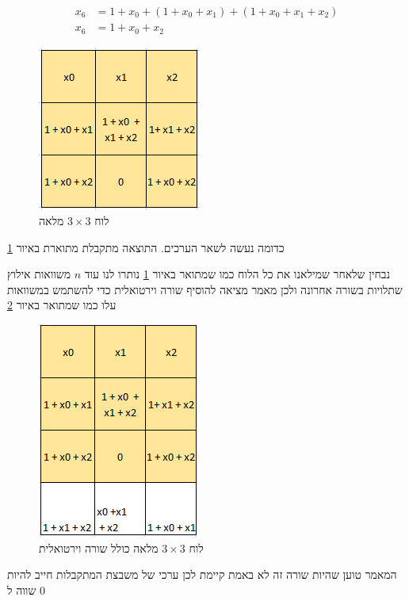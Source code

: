 \documentclass[12pt,twoside]{article}
\begin{document}
\begin{align*}
    x_6 &= 1 + x_0 + (1 + x_0 + x_1) + (1 + x_0 + x_1 + x_2) \\
    x_6 &= 1 + x_0 + x_2
\end{align*}

\begin{figure}[ht]
    \caption{לוח 
    $3 \times 3$
    מלאה}
    \label{fig: 3 x 3 board fill intire board}
    \unsethebrew
    \centering
    \includegraphics[width=.3\textwidth,height=.3\textheight,keepaspectratio]{images/3x3_fill_all.PNG}
\end{figure}
\sethebrew

כדומה נעשה לשאר הערכים.
התוצאה מתקבלת מתוארת באיור 
\ref{fig: 3 x 3 board fill intire board}

נבחין שלאחר שמילאנו את כל הלוח כמו שמתואר באיור 
\ref{fig: 3 x 3 board fill intire board}
נותרו לנו עוד 
$n$
משוואות אילוץ שתלויות בשורה אחרונה ולכן מאמר 
\cite{B1}
מציאה להוסיף שורה וירטואלית כדי להשתמש 
במשוואות עלו
כמו שמתואר באיור 
\ref{fig: 3 x 3 board fill with virtual}

\begin{figure}[ht]
    \caption{לוח 
    $3 \times 3$
    מלאה
    כולל שורה וירטואלית
    }
    \label{fig: 3 x 3 board fill with virtual}
    \unsethebrew
    \centering
    \includegraphics[width=.3\textwidth,height=.3\textheight,keepaspectratio]{images/3x3_fill_virtual.PNG}
\end{figure}
\sethebrew

המאמר טוען שהיות שורה זה לא באמת קיימת לכן
ערכי 
של משבצת המתקבלות 
חייב להיות שווה 
ל
$0$
\end{document}
